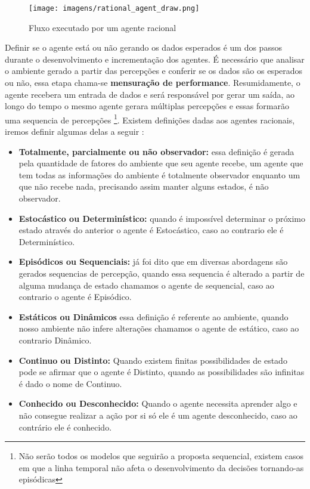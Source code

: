 \begin{figure}
    \centering
    \texttt{[image: imagens/rational\_agent\_draw.png]}
    \caption{Fluxo executado por um agente racional}
    \label{fig:rational_agent_draw}
\end{figure}

Definir se o agente está ou não gerando os dados esperados é um dos passos durante o desenvolvimento e incrementação dos agentes. É necessário que analisar o ambiente gerado a partir das percepções e conferir se os dados são os esperados ou não, essa etapa chama-se \textbf{mensuração de performance}. Resumidamente, o agente recebera um entrada de dados e será responsável por gerar um saída, ao longo do tempo o mesmo agente gerara múltiplas percepções e essas formarão uma sequencia de percepções \footnote{Não serão todos os modelos que seguirão a proposta sequencial, existem casos em que a linha temporal não afeta o desenvolvimento da decisões tornando-as episódicas}. Existem definições dadas aos agentes racionais, iremos definir algumas delas a seguir \cite[34-45]{russell2003artificial}:

\begin{itemize}
 \item \textbf{Totalmente, parcialmente ou não observador:} essa definição é gerada pela quantidade de fatores do ambiente que seu agente recebe, um agente que tem todas as informações do ambiente é totalmente observador enquanto um que não recebe nada, precisando assim manter alguns estados, é não observador.
 \item \textbf{Estocástico ou Determinístico:} quando é impossível determinar o próximo estado através do anterior o agente é Estocástico, caso ao contrario ele é Determinístico.
 \item \textbf{Episódicos ou Sequenciais:} já foi dito que em diversas abordagens são gerados sequencias de percepção, quando essa sequencia é alterado a partir de alguma mudança de estado chamamos o agente de sequencial, caso ao contrario o agente é Episódico.
 \item \textbf{Estáticos ou Dinâmicos} essa definição é referente ao ambiente, quando nosso ambiente não infere alterações chamamos o agente de estático, caso ao contrario Dinâmico.
 \item \textbf{Continuo ou Distinto:} Quando existem finitas possibilidades de estado pode se afirmar que o agente é Distinto, quando as possibilidades são infinitas é dado o nome de Continuo.
 \item \textbf{Conhecido ou Desconhecido:} Quando o agente necessita aprender algo e não consegue realizar a ação por si só ele é um agente desconhecido, caso ao contrário ele é conhecido.
\end{itemize}

